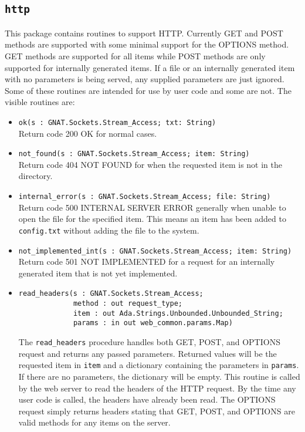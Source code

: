 \documentclass[10pt, openany, draft]{article}
\begin{document}
\subsection{\texttt{http}}
This package contains routines to support HTTP.  Currently GET and POST methods are supported with some minimal support for the OPTIONS method.  GET methods are supported for all items while POST methods are only supported for internally generated items.  If a file or an internally generated item with no parameters is being served, any supplied parameters are just ignored. Some of these routines are intended for use by user code and some are not.  The visible routines are:
\begin{itemize}
  \item \verb|ok(s : GNAT.Sockets.Stream_Access; txt: String)|\\
  Return code 200 OK for normal cases.
  \item \verb|not_found(s : GNAT.Sockets.Stream_Access; item: String)|\\
  Return code 404 NOT FOUND for when the requested item is not in the directory.
  \item \verb|internal_error(s : GNAT.Sockets.Stream_Access; file: String)|\\
  Return code 500 INTERNAL SERVER ERROR generally when unable to open the file for the specified item.  This means an item has been added to \texttt{config.txt} without adding the file to the system.
  \item \verb|not_implemented_int(s : GNAT.Sockets.Stream_Access; item: String)|\\
  Return code 501 NOT IMPLEMENTED for a request for an internally generated item that is not yet implemented.
  \item \begin{verbatim}read_headers(s : GNAT.Sockets.Stream_Access;
             method : out request_type;
             item : out Ada.Strings.Unbounded.Unbounded_String;
             params : in out web_common.params.Map)
            \end{verbatim}
   The \texttt{read\_headers} procedure handles both GET, POST, and OPTIONS request and returns any passed parameters.  Returned values will be the requested item in \texttt{item} and a dictionary containing the parameters in \texttt{params}.  If there are no parameters, the dictionary will be empty.  This routine is called by the web server to read the headers of the HTTP request.  By the time any user code is called, the headers have already been read.  The OPTIONS request simply returns headers stating that GET, POST, and OPTIONS are valid methods for any items on the server.
\end{itemize}
\end{document}
